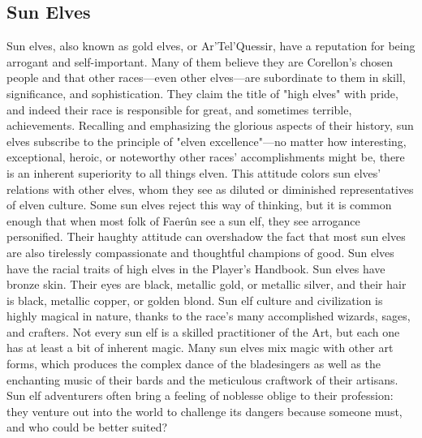 \documentclass[10pt,a4paper,twoside,twocolumn,openany,bg=print,nodeprecatedcode]{dndbook}
\begin{document}
\subsection{Sun Elves}
Sun elves, also known as gold elves, or Ar'Tel'Quessir, have a reputation for being arrogant and self-important. Many of them believe they are Corellon's chosen people and that other races—even other elves—are subordinate to them in skill, significance, and sophistication. They claim the title of "high elves" with pride, and indeed their race is responsible for great, and sometimes terrible, achievements.
Recalling and emphasizing the glorious aspects of their history, sun elves subscribe to the principle of "elven excellence"—no matter how interesting, exceptional, heroic, or noteworthy other races' accomplishments might be, there is an inherent superiority to all things elven. This attitude colors sun elves' relations with other elves, whom they see as diluted or diminished representatives of elven culture. Some sun elves reject this way of thinking, but it is common enough that when most folk of Faerûn see a sun elf, they see arrogance personified. Their haughty attitude can overshadow the fact that most sun elves are also tirelessly compassionate and thoughtful champions of good.
Sun elves have the racial traits of high elves in the Player's Handbook. Sun elves have bronze skin. Their eyes are black, metallic gold, or metallic silver, and their hair is black, metallic copper, or golden blond.
Sun elf culture and civilization is highly magical in nature, thanks to the race's many accomplished wizards, sages, and crafters. Not every sun elf is a skilled practitioner of the Art, but each one has at least a bit of inherent magic. Many sun elves mix magic with other art forms, which produces the complex dance of the bladesingers as well as the enchanting music of their bards and the meticulous craftwork of their artisans. Sun elf adventurers often bring a feeling of noblesse oblige to their profession: they venture out into the world to challenge its dangers because someone must, and who could be better suited?
\end{document}
